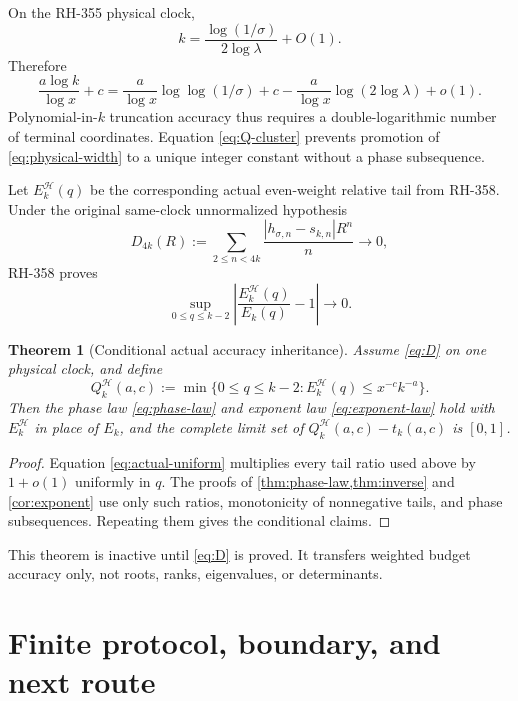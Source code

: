 \documentclass[11pt]{article}
\newtheorem{theorem}{Theorem}[section]
\theoremstyle{remark}
\newcommand{\cH}{\mathcal H}
\begin{document}
On the RH-355 physical clock,
\begin{equation}\label{eq:physical-clock}
 k=\frac{\log(1/\sigma)}{2\log\lambda}+O(1).
\end{equation}
Therefore
\begin{equation}\label{eq:physical-width}
 \frac{a\log k}{\log x}+c
 =\frac{a}{\log x}\log\log(1/\sigma)
 +c-\frac{a}{\log x}\log(2\log\lambda)+o(1).
\end{equation}
Polynomial-in-$k$ truncation accuracy thus requires a double-logarithmic
number of terminal coordinates.  Equation \eqref{eq:Q-cluster} prevents
promotion of \eqref{eq:physical-width} to a unique integer constant without
a phase subsequence.

Let $E_k^{\cH}(q)$ be the corresponding actual even-weight relative tail from
RH-358.  Under the original same-clock unnormalized hypothesis
\begin{equation}\label{eq:D}
 D_{4k}(R):=\sum_{2\le n<4k}
 \frac{|h_{\sigma,n}-s_{k,n}|R^n}{n}\longrightarrow0,
\end{equation}
RH-358 proves
\begin{equation}\label{eq:actual-uniform}
 \sup_{0\le q\le k-2}
 \left|\frac{E_k^{\cH}(q)}{E_k(q)}-1\right|\longrightarrow0.
\end{equation}

\begin{theorem}[Conditional actual accuracy inheritance]
Assume \eqref{eq:D} on one physical clock, and define
\[
 Q_k^{\cH}(a,c):=
 \min\{0\le q\le k-2:E_k^{\cH}(q)\le x^{-c}k^{-a}\}.
\]
Then the phase law \eqref{eq:phase-law} and exponent law
\eqref{eq:exponent-law} hold with $E_k^{\cH}$ in place of $E_k$, and the
complete limit set of $Q_k^{\cH}(a,c)-t_k(a,c)$ is $[0,1]$.
\end{theorem}

\begin{proof}
Equation \eqref{eq:actual-uniform} multiplies every tail ratio used above by
$1+o(1)$ uniformly in $q$.  The proofs of \cref{thm:phase-law,thm:inverse}
and \cref{cor:exponent} use only such ratios, monotonicity of nonnegative
tails, and phase subsequences.  Repeating them gives the conditional claims.
\end{proof}

This theorem is inactive until \eqref{eq:D} is proved.  It transfers weighted
budget accuracy only, not roots, ranks, eigenvalues, or determinants.

\section{Finite protocol, boundary, and next route}
\end{document}
